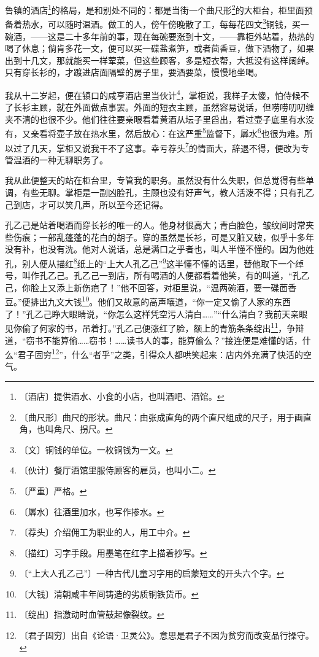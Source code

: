 \documentclass[12pt,UTF-8,openany]{ctexbook}
\begin{document}
\begin{large}
    
    鲁镇的酒店\footnote{〔酒店〕提供酒水、小食的小店，也叫酒吧、酒馆。}的格局，是和别处不同的：都是当街一个曲尺形\footnote{〔曲尺形〕曲尺的形状。曲尺：由张成直角的两个直尺组成的尺子，用于画直角，也叫角尺、拐尺。}的大柜台，柜里面预备着热水，可以随时温酒。做工的人，傍午傍晚散了工，每每花四文\footnote{〔文〕铜钱的单位。一枚铜钱为一文。}铜钱，买一碗酒，——这是二十多年前的事，现在每碗要涨到十文，——靠柜外站着，热热的喝了休息；倘肯多花一文，便可以买一碟盐煮笋，或者茴香豆，做下酒物了，如果出到十几文，那就能买一样荤菜，但这些顾客，多是短衣帮，大抵没有这样阔绰。只有穿长衫的，才踱进店面隔壁的房子里，要酒要菜，慢慢地坐喝。
    
    我从十二岁起，便在镇口的咸亨酒店里当伙计\footnote{〔伙计〕餐厅酒馆里服侍顾客的雇员，也叫小二。}，掌柜说，我样子太傻，怕侍候不了长衫主顾，就在外面做点事罢。外面的短衣主顾，虽然容易说话，但唠唠叨叨缠夹不清的也很不少。他们往往要亲眼看着黄酒从坛子里舀出，看过壶子底里有水没有，又亲看将壶子放在热水里，然后放心：在这严重\footnote{〔严重〕严格。}监督下，羼水\footnote{〔羼水〕往酒里加水，也写作掺水。}也很为难。所以过了几天，掌柜又说我干不了这事。幸亏荐头\footnote{〔荐头〕介绍佣工为职业的人，用工中介。}的情面大，辞退不得，便改为专管温酒的一种无聊职务了。
    
    我从此便整天的站在柜台里，专管我的职务。虽然没有什么失职，但总觉得有些单调，有些无聊。掌柜是一副凶脸孔，主顾也没有好声气，教人活泼不得；只有孔乙己到店，才可以笑几声，所以至今还记得。
    
    孔乙己是站着喝酒而穿长衫的唯一的人。他身材很高大；青白脸色，皱纹间时常夹些伤痕；一部乱蓬蓬的花白的胡子。穿的虽然是长衫，可是又脏又破，似乎十多年没有补，也没有洗。他对人说话，总是满口之乎者也，叫人半懂不懂的。因为他姓孔，别人便从描红\footnote{〔描红〕习字手段。用墨笔在红字上描着抄写。}纸上的“上大人孔乙己”\footnote{〔“上大人孔乙己”〕一种古代儿童习字用的启蒙短文的开头六个字。}这半懂不懂的话里，替他取下一个绰号，叫作孔乙己。孔乙己一到店，所有喝酒的人便都看着他笑，有的叫道，“孔乙己，你脸上又添上新伤疤了！”他不回答，对柜里说，“温两碗酒，要一碟茴香豆。”便排出九文大钱\footnote{〔大钱〕清朝咸丰年间铸造的劣质铜铁货币。}。他们又故意的高声嚷道，“你一定又偷了人家的东西了！”孔乙己睁大眼睛说，“你怎么这样凭空污人清白……”“什么清白？我前天亲眼见你偷了何家的书，吊着打。”孔乙己便涨红了脸，额上的青筋条条绽出\footnote{〔绽出〕指激动时血管鼓起像裂纹。}，争辩道，“窃书不能算偷……窃书！……读书人的事，能算偷么？”接连便是难懂的话，什么“君子固穷\footnote{〔君子固穷〕出自《论语·卫灵公》。意思是君子不因为贫穷而改变品行操守。}”，什么“者乎”之类，引得众人都哄笑起来：店内外充满了快活的空气。
    

\end{large}
\end{document}
